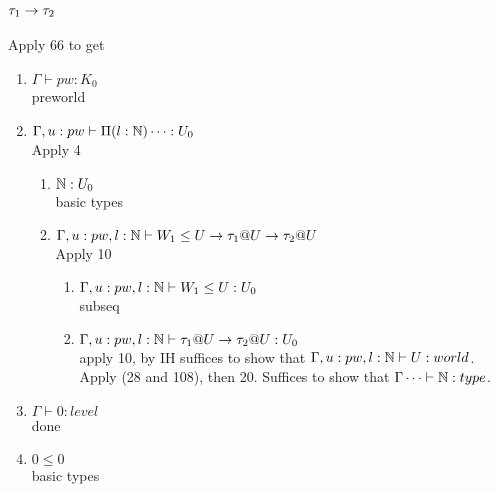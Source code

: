 \documentclass{article}
\begin{document}
\subsection{$\tau_1 \rightarrow \tau_2$}
    Apply 66 to get
    \begin{enumerate}
        \item $\Gamma \vdash pw : K_0$\\
        preworld
        \item $\Gamma, u: pw \vdash \Pi(l: \mathbb{N}) \dots :U_0$\\
        Apply 4
        \begin{enumerate}
            \item $\mathbb{N} : U_0$\\
            basic types
            \item $\Gamma, u: pw, l : \mathbb{N} \vdash 
            W_1 \leq U \rightarrow \tau_1@U \rightarrow \tau_2@U
            $\\
            Apply 10
            \begin{enumerate}
                \item $\Gamma, u: pw, l : \mathbb{N} \vdash 
            W_1 \leq U : U_0$\\
            subseq
            \item $\Gamma, u: pw, l : \mathbb{N} \vdash \tau_1@U \rightarrow \tau_2@U : U_0$\\
            apply 10, by IH suffices to show that 
            $\Gamma, u: pw, l : \mathbb{N} \vdash U: world$. Apply (28 and 108), then 20. Suffices to show that 
            $\Gamma \dots \vdash \mathbb{N}: type$.
            \end{enumerate}
        \end{enumerate}
        \item $\Gamma \vdash 0: level$\\
        done
        \item $0 \leq 0$\\
       basic types
    \end{enumerate}
\end{document}
